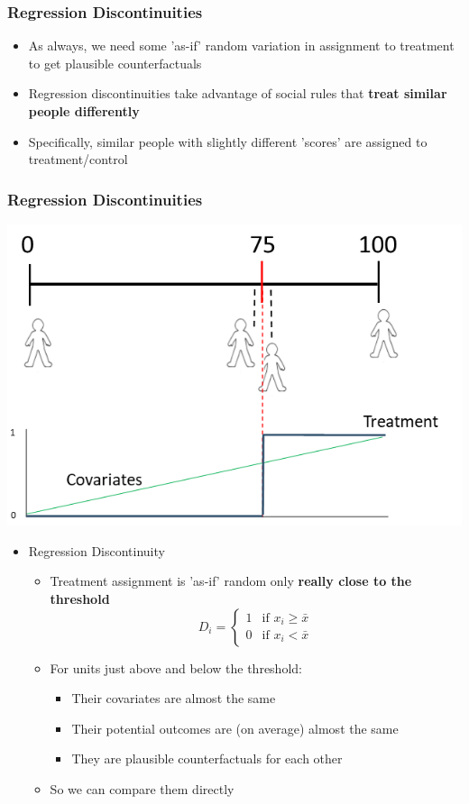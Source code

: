 \documentclass[xcolor=x11names,compress]{beamer}\usepackage[]{graphicx}\usepackage[]{xcolor}
\renewcommand{\(}{\begin{columns}}
\renewcommand{\)}{\end{columns}}
\newcommand{\<}[1]{\begin{column}{#1}}
\renewcommand{\>}{\end{column}}
\begin{document}
\begin{frame}
\frametitle{Regression Discontinuities}
\begin{itemize}
\item As always, we need some 'as-if' random variation in assignment to treatment to get plausible counterfactuals
\pause
\item Regression discontinuities take advantage of social rules that \textbf{treat similar people differently}
\pause
\item Specifically, similar people with slightly different 'scores' are assigned to treatment/control
\end{itemize}
\end{frame}

\begin{frame}
\frametitle{Regression Discontinuities}
\begin{center}
\includegraphics[scale=0.45]{Scale.png}
\end{center}
\end{frame}

\begin{frame}
\begin{itemize}
\item Regression Discontinuity
\begin{itemize}
\item Treatment assignment is 'as-if' random only \textbf{really close to the threshold}
\pause
\[
D_i=
\begin{cases}
1 & \text{if }x_i \geq \bar{x} \\
0 & \text{if }x_i < \bar{x}
\end{cases}
\]
\pause
\item For units just above and below the threshold:
\begin{itemize}
\item Their covariates are almost the same
\item Their potential outcomes are (on average) almost the same
\item They are plausible counterfactuals for each other
\end{itemize}
\pause
\item So we can compare them directly
\end{itemize}
\end{itemize}
\end{frame}
\end{document}
